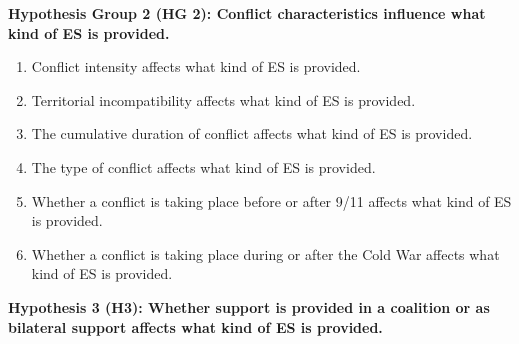 \documentclass[
]{article}
\begin{document}
\textbf{Hypothesis Group 2 (HG 2): Conflict characteristics influence
what kind of ES is provided.}

\begin{enumerate}
\def\labelenumi{\alph{enumi})}
\item
  Conflict intensity affects what kind of ES is provided.
\item
  Territorial incompatibility affects what kind of ES is provided.
\item
  The cumulative duration of conflict affects what kind of ES is
  provided.
\item
  The type of conflict affects what kind of ES is provided.
\item
  Whether a conflict is taking place before or after 9/11 affects what
  kind of ES is provided.
\item
  Whether a conflict is taking place during or after the Cold War
  affects what kind of ES is provided.
\end{enumerate}

\textbf{Hypothesis 3 (H3): Whether support is provided in a coalition or
as bilateral support affects what kind of ES is provided.}
\end{document}
